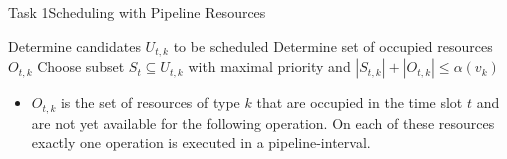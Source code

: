\begin{frame}[fragile]{Task 1}{Scheduling with Pipeline Resources}
  \begin{solutionnoinc}
      \begin{algorithm}[H]
      [...]\;
      Determine candidates $U_{t, k}$ to be scheduled\;
      Determine set of occupied resources $O_{t, k}$\;
      Choose subset $S_t \subseteq U_{t, k}$ with maximal priority and $\left|S_{t, k}\right|+\left|O_{t, k}\right| \leq \alpha\left(v_k\right)$\;
      [...]\;
      \end{algorithm}
    \begin{itemize}
      \item $O_{t, k}$ is the set of resources of type $k$ that are occupied in the time slot $t$ and are not yet available for the following operation. On each of these resources exactly one operation is executed in a pipeline-interval.
    \end{itemize}
  \end{solutionnoinc}
\end{frame}
